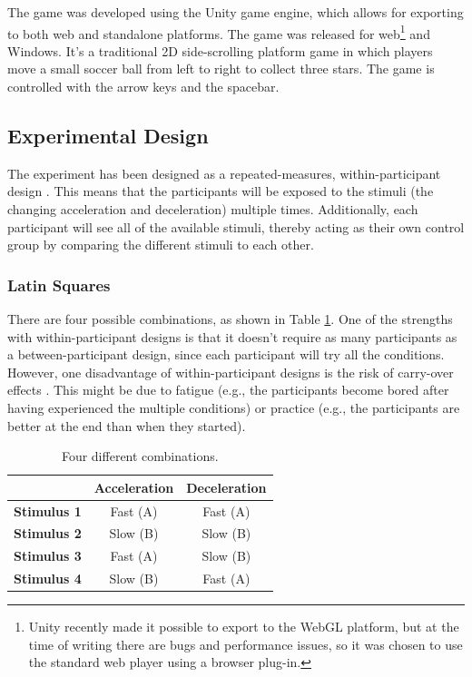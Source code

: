 The game was developed using the Unity game engine, which allows for exporting to both web and standalone platforms. The game was released for web\footnote{Unity recently made it possible to export to the WebGL platform, but at the time of writing there are bugs and performance issues, so it was chosen to use the standard web player using a browser plug-in.} and Windows. It's a traditional 2D side-scrolling platform game in which players move a small soccer ball from left to right to collect three stars. The game is controlled with the arrow keys and the spacebar.

\subsection{Experimental Design}
The experiment has been designed as a repeated-measures, within-participant design \cite{cunningham}. This means that the participants will be exposed to the stimuli (the changing acceleration and deceleration) multiple times. Additionally, each participant will see all of the available stimuli, thereby acting as their own control group by comparing the different stimuli to each other.

\subsubsection{Latin Squares} \label{latinSection}
There are four possible combinations, as shown in Table \ref{tab:combinations}. One of the strengths with within-participant designs is that it doesn't require as many participants as a between-participant design, since each participant will try all the conditions. However, one disadvantage of within-participant designs is the risk of carry-over effects \cite{experimental1}. This might be due to fatigue (e.g., the participants become bored after having experienced the multiple conditions) or practice (e.g., the participants are better at the end than when they started).

\begin{table}[htbp]
\small
\centering
\begin{tabular}{|c|c|c|}
\hline  & \textbf{Acceleration}
& \textbf{Deceleration}\\\hline
\textbf{Stimulus 1} & Fast (A)
& Fast (A)
\\\hline
\textbf{Stimulus 2} & Slow (B)
& Slow (B)
\\\hline
\textbf{Stimulus 3} & Fast (A)
& Slow (B)
\\\hline
\textbf{Stimulus 4} & Slow (B)
& Fast (A)
\\\hline
\end{tabular}
\caption{Four different combinations.}
\label{tab:combinations}
\end{table}

